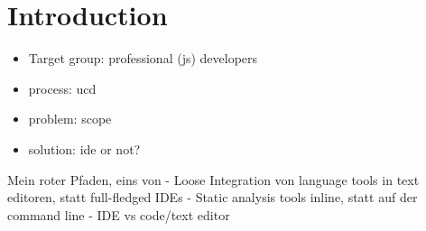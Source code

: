 \chapter{Introduction}\label{introduction}

\begin{itemize}
\itemsep1pt\parskip0pt
\item
  Target group: professional (js) developers
\item
  process: ucd
\item
  problem: scope
\item
  solution: ide or not?
\end{itemize}

Mein roter Pfaden, eins von - Loose Integration von language tools in
text editoren, statt full-fledged IDEs - Static analysis tools inline,
statt auf der command line - IDE vs code/text editor
